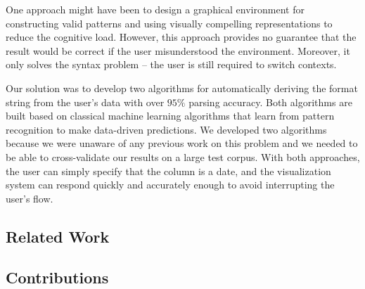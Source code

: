 One approach might have been to design a graphical environment for constructing valid patterns and using visually compelling representations to reduce the cognitive load. 
However, this approach provides no guarantee that the result would be correct if the user misunderstood the environment. 
Moreover, it only solves the syntax problem -- the user is still required to switch contexts.

Our solution was to develop two algorithms for automatically deriving the format string from the user's data with over $95\%$ parsing accuracy. Both algorithms are built based on classical machine learning algorithms that learn from pattern recognition to make data-driven predictions. We developed two algorithms because we were unaware of any previous work on this problem and we needed to be able to cross-validate our results on a large test corpus. With both approaches, the user can simply specify that the column is a date, and the visualization system can respond quickly and accurately enough to avoid interrupting the user's flow.

\subsection{Related Work}


\subsection{Contributions}

